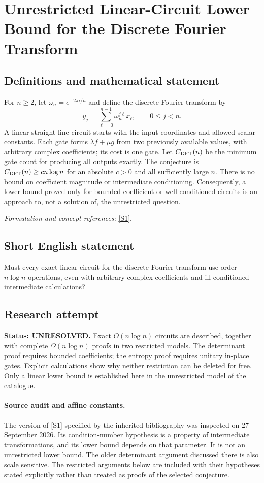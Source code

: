 \documentclass[11pt]{article}
\begin{document}
\section*{\texorpdfstring{Unrestricted Linear-Circuit Lower Bound for the Discrete Fourier Transform}{Unrestricted Linear-Circuit Lower Bound for the Discrete Fourier Transform}}\label{308}
\subsection{Definitions and mathematical statement}
For $n\ge2$, let $\omega_n=e^{-2\pi i/n}$ and define the discrete Fourier transform by
\[
 y_j=\sum_{\ell=0}^{n-1}\omega_n^{j\ell}x_\ell,
 \qquad0\le j<n.
\]
A linear straight-line circuit starts with the input coordinates and allowed scalar constants. Each gate forms $\lambda f+\mu g$ from two previously available values, with arbitrary complex coefficients; its cost is one gate. Let $C_{\rm DFT}(n)$ be the minimum gate count for producing all outputs exactly. The conjecture is $C_{\rm DFT}(n)\ge c n\log n$ for an absolute $c>0$ and all sufficiently large $n$. There is no bound on coefficient magnitude or intermediate conditioning. Consequently, a lower bound proved only for bounded-coefficient or well-conditioned circuits is an approach to, not a solution of, the unrestricted question.
\par\smallskip\textit{Formulation and concept references:} \href{https://arxiv.org/pdf/1403.1307v5}{[S1]}.

\subsection{Short English statement}
Must every exact linear circuit for the discrete Fourier transform use order $n\log n$ operations, even with arbitrary complex coefficients and ill-conditioned intermediate calculations?
\subsection{Research attempt}
\textbf{Status: UNRESOLVED.} Exact $O(n\log n)$ circuits are described, together with complete $\Omega(n\log n)$ proofs in two restricted models. The determinant proof requires bounded coefficients; the entropy proof requires unitary in-place gates. Explicit calculations show why neither restriction can be deleted for free. Only a linear lower bound is established here in the unrestricted model of the catalogue.

\paragraph{Source audit and affine constants.}
The version of [S1] specified by the inherited bibliography was inspected on 27 September 2026. Its condition-number hypothesis is a property of intermediate transformations, and its lower bound depends on that parameter. It is not an unrestricted lower bound. The older determinant argument discussed there is also scale sensitive. The restricted arguments below are included with their hypotheses stated explicitly rather than treated as proofs of the selected conjecture.
\end{document}
